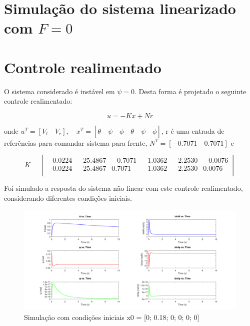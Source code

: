 \documentclass[10pt]{article}
\begin{document}
\section{Simulação do sistema linearizado com $F=0$}

\newpage

\section{Controle realimentado}

\quad O sistema considerado é instável em $\psi = 0$.
Desta forma é projetado o seguinte controle realimentado:

\begin{equation}
    u = -Kx + Nr
\end{equation}

onde $u^T = [V_l \quad V_r], \quad x^T = [\theta \quad \psi \quad \phi \quad \dot{\theta} \quad \dot{\psi} \quad \dot{\phi}]$,
r é uma entrada de referências para comandar sistema para frente, $N^T = [-0.7071 \quad 0.7071]$ e

\begin{equation}
    K = \begin{bmatrix}
    -0.0224 & -25.4867 & -0.7071 & -1.0362 & -2.2530 & -0.0076 \\
    -0.0224 & -25.4867 & 0.7071 & -1.0362 & -2.2530 & 0.0076 \\
\end{bmatrix}
\end{equation}

\quad Foi simulado a resposta do sistema não linear com este controle realimentado,
considerando diferentes condições iniciais.

\begin{figure}[h]
    \centering
    \includegraphics[scale=0.17]{ode45_1_r.png}
    \caption{Simulação com condições iniciais x0 = [0; 0.18; 0; 0; 0; 0]}
\end{figure}
\end{document}
